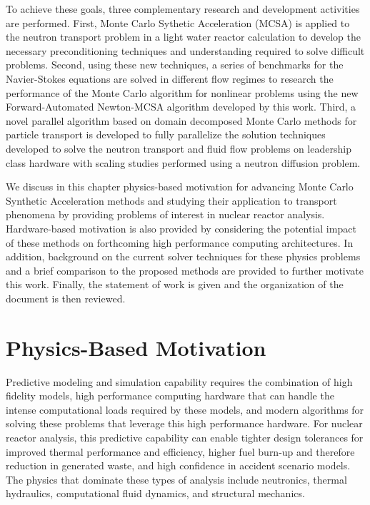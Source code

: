 To achieve these goals, three complementary research and development
activities are performed. First, Monte Carlo Sythetic Acceleration
(MCSA) is applied to the neutron transport problem in a light water
reactor calculation to develop the necessary preconditioning
techniques and understanding required to solve difficult
problems. Second, using these new techniques, a series of benchmarks
for the Navier-Stokes equations are solved in different flow regimes
to research the performance of the Monte Carlo algorithm for nonlinear
problems using the new Forward-Automated Newton-MCSA algorithm
developed by this work. Third, a novel parallel algorithm based on
domain decomposed Monte Carlo methods for particle transport is
developed to fully parallelize the solution techniques developed to
solve the neutron transport and fluid flow problems on leadership
class hardware with scaling studies performed using a neutron
diffusion problem.

We discuss in this chapter physics-based motivation for advancing
Monte Carlo Synthetic Acceleration methods and studying their
application to transport phenomena by providing problems of interest
in nuclear reactor analysis. Hardware-based motivation is also
provided by considering the potential impact of these methods on
forthcoming high performance computing architectures. In addition,
background on the current solver techniques for these physics problems
and a brief comparison to the proposed methods are provided to further
motivate this work. Finally, the statement of work is given and the
organization of the document is then reviewed.

\section{Physics-Based Motivation}
\label{sec:physics_motivation}
Predictive modeling and simulation capability requires the combination
of high fidelity models, high performance computing hardware that can
handle the intense computational loads required by these models, and
modern algorithms for solving these problems that leverage this high
performance hardware. For nuclear reactor analysis, this predictive
capability can enable tighter design tolerances for improved thermal
performance and efficiency, higher fuel burn-up and therefore
reduction in generated waste, and high confidence in accident scenario
models. The physics that dominate these types of analysis include
neutronics, thermal hydraulics, computational fluid dynamics, and
structural mechanics.

